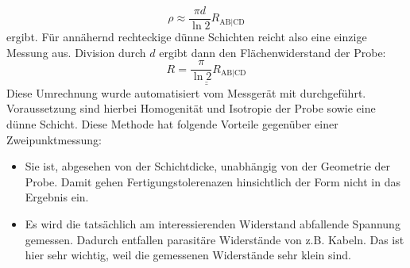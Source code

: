 \documentclass[german,  %
parskip=full,  %
]{scrartcl}
\begin{document}
\[\rho \approx \frac{\pi d}{\ln 2} R_{\mathrm{AB|CD}}\] 
ergibt. Für annähernd rechteckige dünne Schichten reicht also eine einzige Messung aus. Division durch \(d\) ergibt dann den Flächenwiderstand der Probe:
\[\underline{\underline{R = \frac{\pi }{\ln 2} R_{\mathrm{AB|CD}}}}\]
Diese Umrechnung wurde automatisiert vom Messgerät mit durchgeführt. Voraussetzung sind hierbei Homogenität und Isotropie der Probe sowie eine dünne Schicht. Diese Methode hat folgende Vorteile gegenüber einer Zweipunktmessung:
\begin{itemize}
\item Sie ist, abgesehen von der Schichtdicke, unabhängig von der Geometrie der Probe. Damit gehen Fertigungstolerenazen hinsichtlich der Form nicht in das Ergebnis ein.
\item Es wird die tatsächlich am interessierenden Widerstand abfallende Spannung gemessen. Dadurch entfallen parasitäre Widerstände von z.B. Kabeln. Das ist hier sehr wichtig, weil die gemessenen Widerstände sehr klein sind.
\end{itemize} 
\end{document}
